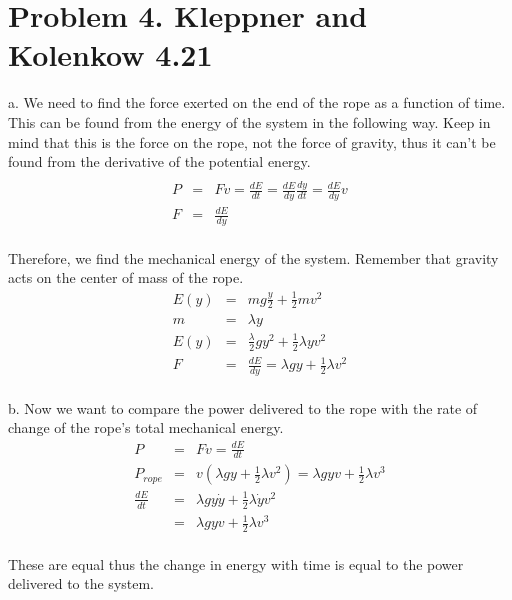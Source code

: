 \documentclass[11pt]{amsart}
\begin{document}
\section{Problem 4. Kleppner and Kolenkow 4.21}
a. We need to find the force exerted on the end of the rope as a function of time. This can be found from the energy of the system in the following way. Keep in mind that this is the force on the rope, not the force of gravity, thus it can't be found from the derivative of the potential energy. \\ 
\begin{eqnarray*} \\
P &=& Fv = \frac{dE}{dt} = \frac{dE}{dy}\frac{dy}{dt} = \frac{dE}{dy}v \\
F &=& \frac{dE}{dy} 
\end{eqnarray*} \\
Therefore, we find the mechanical energy of the system. Remember that gravity acts on the center of mass of the rope. \\
\begin{eqnarray*}
E(y) &=& mg\frac{y}{2}+\frac{1}{2}mv^{2}  \\
m &=& \lambda{y} \\
E(y) &=& \frac{\lambda}{2}gy^{2}+\frac{1}{2}\lambda{y}v^{2} \\
F &=& \frac{dE}{dy} = \lambda{}gy+\frac{1}{2}\lambda{}v^{2} 
\end{eqnarray*} \\
b. Now we want to compare the power delivered to the rope with the rate of change of the rope's total mechanical energy. \\ 
\begin{eqnarray*}
P &=& Fv = \frac{dE}{dt} \\
P_{rope} &=& v(\lambda{}gy+\frac{1}{2}\lambda{}v^{2}) = \lambda{}gyv+\frac{1}{2}\lambda{}v^{3} \\
\frac{dE}{dt} &=& \lambda{}gy\dot{y}+\frac{1}{2}\lambda\dot{y}v^{2} \\
&=& \lambda{}gyv+\frac{1}{2}\lambda{}v^{3} 
\end{eqnarray*} \\
These are equal thus the change in energy with time is equal to the power delivered to the system. \\ 
\end{document}

